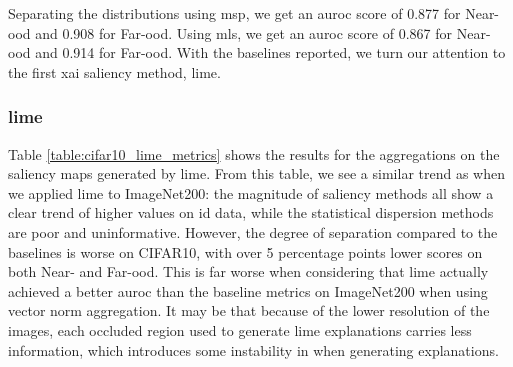 \documentclass[UKenglish]{uiomasterthesis} %
\theoremstyle{definition}
\begin{document}
Separating the distributions using \ac{msp}, we get an \ac{auroc} score of 0.877 for Near-\ac{ood} and 0.908 for Far-\ac{ood}. Using \ac{mls}, we get an \ac{auroc} score of 0.867 for Near-\ac{ood} and 0.914 for Far-\ac{ood}. With the baselines reported, we turn our attention to the first \ac{xai} saliency method, \ac{lime}.

\subsubsection{\ac{lime}}

Table \ref{table:cifar10_lime_metrics} shows the results for the aggregations on the saliency maps generated by \ac{lime}. From this table, we see a similar trend as when we applied \ac{lime} to ImageNet200: the magnitude of saliency methods all show a clear trend of higher values on \ac{id} data, while the statistical dispersion methods are poor and uninformative. However, the degree of separation compared to the baselines is worse on CIFAR10, with over 5 percentage points lower scores on both Near- and Far-\ac{ood}. This is far worse when considering that \ac{lime} actually achieved a better \ac{auroc} than the baseline metrics on ImageNet200 when using vector norm aggregation. It may be that because of the lower resolution of the images, each occluded region used to generate \ac{lime} explanations carries less information, which introduces some instability in when generating explanations.
\end{document}
